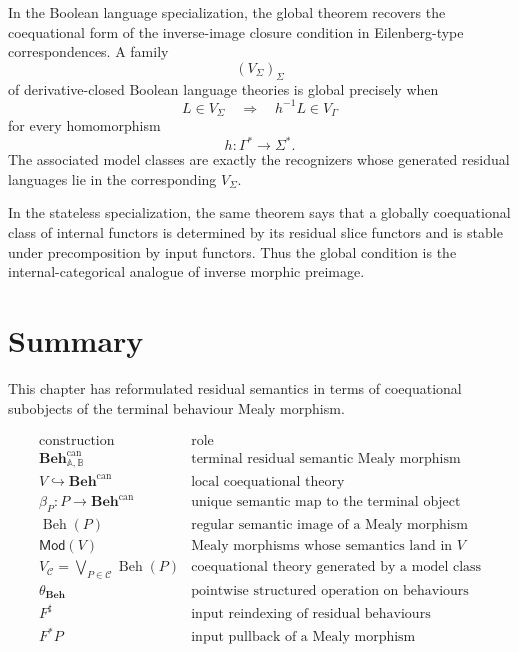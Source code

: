 In the Boolean language specialization, the global theorem recovers the
coequational form of the inverse-image closure condition in Eilenberg-type
correspondences. A family
\[
    (V_\Sigma)_\Sigma
\]
of derivative-closed Boolean language theories is global precisely when
\[
    L\in V_\Sigma
    \quad\Longrightarrow\quad
    h^{-1}L\in V_\Gamma
\]
for every homomorphism
\[
    h:\Gamma^*\to\Sigma^*.
\]
The associated model classes are exactly the recognizers whose generated
residual languages lie in the corresponding \(V_\Sigma\).

In the stateless specialization, the same theorem says that a globally
coequational class of internal functors is determined by its residual slice
functors and is stable under precomposition by input functors. Thus the global
condition is the internal-categorical analogue of inverse morphic preimage.

\section{Summary}
\label{sec:coequations-birkhoff-summary}

This chapter has reformulated residual semantics in terms of coequational
subobjects of the terminal behaviour Mealy morphism.

\[
\begin{array}{c|l}
\text{construction} & \text{role} \\
\hline
\mathbf{Beh}^{\mathrm{can}}_{\mathbb A,\mathbb B}
&
\text{terminal residual semantic Mealy morphism}
\\
V\hookrightarrow \mathbf{Beh}^{\mathrm{can}}
&
\text{local coequational theory}
\\
\beta_P:P\to\mathbf{Beh}^{\mathrm{can}}
&
\text{unique semantic map to the terminal object}
\\
\operatorname{Beh}(P)
&
\text{regular semantic image of a Mealy morphism}
\\
\mathsf{Mod}(V)
&
\text{Mealy morphisms whose semantics land in }V
\\
V_{\mathcal C}
=
\bigvee_{P\in\mathcal C}\operatorname{Beh}(P)
&
\text{coequational theory generated by a model class}
\\
\theta_{\mathbf{Beh}}
&
\text{pointwise structured operation on behaviours}
\\
F^\sharp
&
\text{input reindexing of residual behaviours}
\\
F^*P
&
\text{input pullback of a Mealy morphism}
\end{array}
\]

